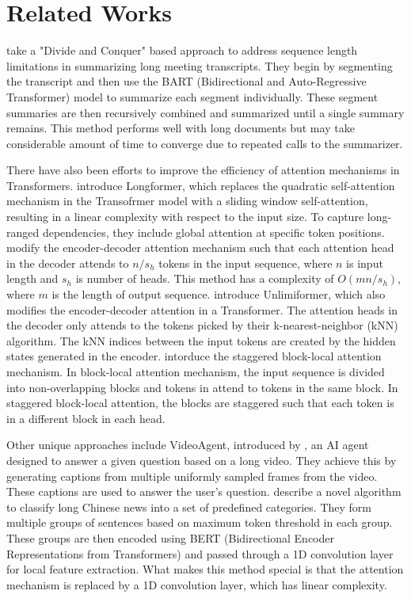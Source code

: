 \section{Related Works}

\citet{golia2024action} take a "Divide and Conquer" based approach to address
sequence length limitations in summarizing long meeting transcripts.
They begin by segmenting the transcript and then use the BART (Bidirectional and
Auto-Regressive Transformer) model to summarize each segment individually.
These segment summaries are then recursively combined and summarized until a single
summary remains.
This method performs well with long documents but may take considerable amount of time
to converge due to repeated calls to the summarizer.

There have also been efforts to improve the efficiency of attention mechanisms in Transformers.
\citet{beltagy2020longformer} introduce Longformer, which replaces the quadratic
self-attention mechanism in the Transofrmer model with a sliding window self-attention,
resulting in a linear complexity with respect to the input size.
To capture long-ranged dependencies, they include global attention at specific token positions.
\citet{huang-etal-2021-efficient} modify the encoder-decoder attention mechanism such that
each attention head in the decoder attends to $n/s_h$ tokens in the input sequence, where
$n$ is input length and $s_h$ is number of heads.
This method has a complexity of $O(mn/s_h)$, where $m$ is the length of output sequence.
\citet{bertsch2023unlimiformer} introduce Unlimiformer, which also modifies the encoder-decoder
attention in a Transformer.
The attention heads in the decoder only attends to the tokens picked by their
k-nearest-neighbor (kNN) algorithm.
The kNN indices between the input tokens are created by the hidden states generated in the
encoder.
\citet{phang2022investigating} intorduce the staggered block-local attention mechanism.
In block-local attention mechanism, the input sequence is divided into non-overlapping blocks
and tokens in attend to tokens in the same block.
In staggered block-local attention, the blocks are staggered such that each token is in a
different block in each head.

Other unique approaches include VideoAgent, introduced by \citet{wang2024videoagent}, an
AI agent designed to answer a given question based on a long video.
They achieve this by generating captions from multiple uniformly sampled frames from the
video.
These captions are used to answer the user's question.
\citet{chen2022long} describe a novel algorithm to classify long Chinese news into a set
of predefined categories.
They form multiple groups of sentences based on maximum token threshold in each group.
These groups are then encoded using BERT (Bidirectional Encoder Representations from
Transformers) and passed through a 1D convolution layer for local feature extraction.
What makes this method special is that the attention mechanism is replaced by a 1D
convolution layer, which has linear complexity.
